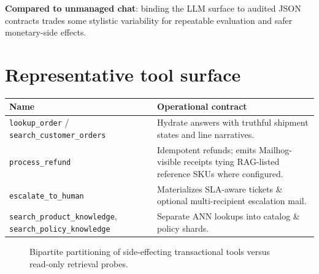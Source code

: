 \documentclass[11pt,a4paper,twoside]{report}
\begin{document}
\textbf{Compared to unmanaged chat}: binding the LLM surface to audited JSON contracts trades some stylistic variability for repeatable evaluation and safer monetary-side effects.

\section{Representative tool surface}

\begin{tabularx}{\textwidth}{@{} l X @{}}
\toprule
\textbf{Name} & \textbf{Operational contract}\\\midrule
\texttt{lookup\_order} / \texttt{search\_customer\_orders} & Hydrate answers with truthful shipment states and line narratives.\\
\texttt{process\_refund} & Idempotent refunds; emits Mailhog-visible receipts tying RAG-listed reference SKUs where configured.\\
\texttt{escalate\_to\_human} & Materializes SLA-aware tickets \& optional multi-recipient escalation mail.\\
\texttt{search\_product\_knowledge}, \texttt{search\_policy\_knowledge} & Separate ANN lookups into catalog \& policy shards.\\\bottomrule
\end{tabularx}

\begin{figure}[htbp]
\centering
{}
\caption{Bipartite partitioning of side-effecting transactional tools versus read-only retrieval probes.}
\label{fig:dispatcher}
\end{figure}
\end{document}
